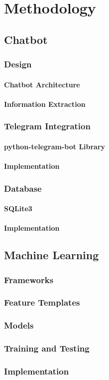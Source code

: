 
\chapter{Methodology}\label{chapter:methodology}

\section{Chatbot}
\subsection{Design}
\subsubsection{Chatbot Architecture}
\subsubsection{Information Extraction}
\subsection{Telegram Integration}
\subsubsection{python-telegram-bot Library}
\subsubsection{Implementation}
\subsection{Database}
\subsubsection{SQLite3}
\subsubsection{Implementation}
\section{Machine Learning}
\subsection{Frameworks}
\subsection{Feature Templates}
\subsection{Models}
\subsection{Training and Testing}
\subsection{Implementation}

